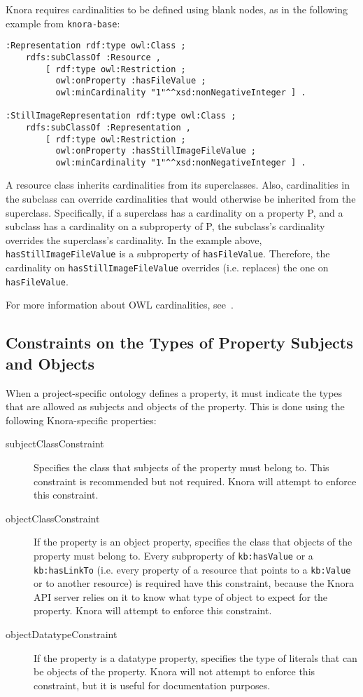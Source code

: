\documentclass[12pt, a4paper]{article}
\begin{document}
Knora requires cardinalities to be defined using blank nodes, as in the following example from \texttt{knora-base}:

\begin{verbatim}
:Representation rdf:type owl:Class ;
    rdfs:subClassOf :Resource ,
        [ rdf:type owl:Restriction ;
          owl:onProperty :hasFileValue ;
          owl:minCardinality "1"^^xsd:nonNegativeInteger ] .
        
:StillImageRepresentation rdf:type owl:Class ;
    rdfs:subClassOf :Representation ,
        [ rdf:type owl:Restriction ;
          owl:onProperty :hasStillImageFileValue ;
          owl:minCardinality "1"^^xsd:nonNegativeInteger ] .
\end{verbatim}

A resource class inherits cardinalities from its superclasses. Also, cardinalities in the subclass can override cardinalities that would otherwise be inherited from the superclass. Specifically, if a superclass has a cardinality on a property P, and a subclass has a cardinality on a subproperty of P, the subclass's cardinality overrides the superclass's cardinality. In the example above, \texttt{hasStillImageFileValue} is a subproperty of \texttt{hasFileValue}. Therefore, the cardinality on \texttt{hasStillImageFileValue} overrides (i.e. replaces) the one on \texttt{hasFileValue}.

For more information about OWL cardinalities, see~\cite[§2.1, Object Property Restrictions]{OWL_2_Quick_Reference_Guide}.

\subsection{Constraints on the Types of Property Subjects and Objects}

\label{subsec:property-restrictions}

When a project-specific ontology defines a property, it must indicate the types that are allowed as subjects and objects of the property. This is done using the following Knora-specific properties:

\begin{description}
	\item[subjectClassConstraint] Specifies the class that subjects of the property must belong to. This constraint is recommended but not required. Knora will attempt to enforce this constraint.
	\item[objectClassConstraint] If the property is an object property, specifies the class that objects of the property must belong to. Every subproperty of \texttt{kb:hasValue} or a \texttt{kb:hasLinkTo} (i.e. every property of a resource that points to a \texttt{kb:Value} or to another resource) is required have this constraint, because the Knora API server relies on it to know what type of object to expect for the property. Knora will attempt to enforce this constraint.
	\item[objectDatatypeConstraint] If the property is a datatype property, specifies the type of literals that can be objects of the property. Knora will not attempt to enforce this constraint, but it is useful for documentation purposes.
\end{description}
\end{document}
